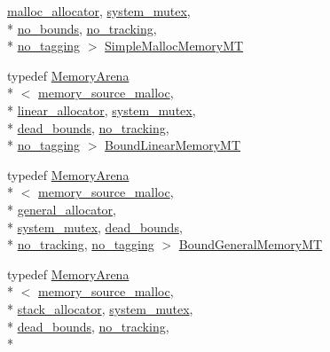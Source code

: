 \begin{DoxyCompactItemize}
\hyperlink{classcrap_1_1malloc__allocator}{malloc\+\_\+allocator}, \hyperlink{classcrap_1_1system__mutex}{system\+\_\+mutex}, \\*
\hyperlink{structcrap_1_1no__bounds}{no\+\_\+bounds}, \hyperlink{structcrap_1_1no__tracking}{no\+\_\+tracking}, \\*
\hyperlink{structcrap_1_1no__tagging}{no\+\_\+tagging} $>$ \hyperlink{namespacecrap_a86d2d770530309cb5cb92249b5efadcb}{Simple\+Malloc\+Memory\+M\+T}
\item 
typedef \hyperlink{classcrap_1_1_memory_arena}{Memory\+Arena}\\*
$<$ \hyperlink{classcrap_1_1memory__source__malloc}{memory\+\_\+source\+\_\+malloc}, \\*
\hyperlink{classcrap_1_1linear__allocator}{linear\+\_\+allocator}, \hyperlink{classcrap_1_1system__mutex}{system\+\_\+mutex}, \\*
\hyperlink{structcrap_1_1dead__bounds}{dead\+\_\+bounds}, \hyperlink{structcrap_1_1no__tracking}{no\+\_\+tracking}, \\*
\hyperlink{structcrap_1_1no__tagging}{no\+\_\+tagging} $>$ \hyperlink{namespacecrap_a55259fc8a1932b947a5b796be2f346dc}{Bound\+Linear\+Memory\+M\+T}
\item 
typedef \hyperlink{classcrap_1_1_memory_arena}{Memory\+Arena}\\*
$<$ \hyperlink{classcrap_1_1memory__source__malloc}{memory\+\_\+source\+\_\+malloc}, \\*
\hyperlink{classcrap_1_1general__allocator}{general\+\_\+allocator}, \\*
\hyperlink{classcrap_1_1system__mutex}{system\+\_\+mutex}, \hyperlink{structcrap_1_1dead__bounds}{dead\+\_\+bounds}, \\*
\hyperlink{structcrap_1_1no__tracking}{no\+\_\+tracking}, \hyperlink{structcrap_1_1no__tagging}{no\+\_\+tagging} $>$ \hyperlink{namespacecrap_a319a79ca62a9c225a5e10d662c366828}{Bound\+General\+Memory\+M\+T}
\item 
typedef \hyperlink{classcrap_1_1_memory_arena}{Memory\+Arena}\\*
$<$ \hyperlink{classcrap_1_1memory__source__malloc}{memory\+\_\+source\+\_\+malloc}, \\*
\hyperlink{classcrap_1_1stack__allocator}{stack\+\_\+allocator}, \hyperlink{classcrap_1_1system__mutex}{system\+\_\+mutex}, \\*
\hyperlink{structcrap_1_1dead__bounds}{dead\+\_\+bounds}, \hyperlink{structcrap_1_1no__tracking}{no\+\_\+tracking}, \\*

\end{DoxyCompactItemize}
